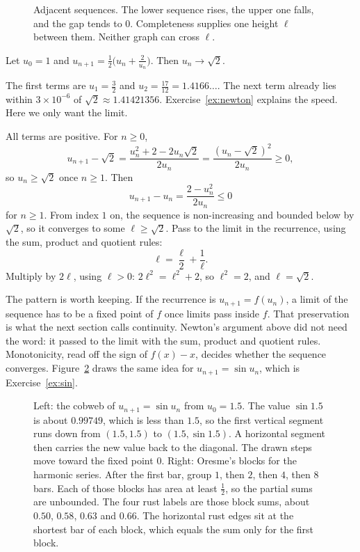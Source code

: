 \begin{figure}[ht]
\centering
{}
\caption{Adjacent sequences. The lower sequence rises, the upper one falls, and the gap tends to $0$. Completeness supplies one height $\ell$ between them. Neither graph can cross $\ell$.}
\label{fig:squeeze}
\end{figure}

\begin{examplex}
Let $u_0=1$ and $u_{n+1}=\frac12\bigl(u_n+\frac2{u_n}\bigr)$. Then $u_n\to\sqrt2$.
\end{examplex}

The first terms are $u_1=\frac32$ and $u_2=\frac{17}{12}=1.4166\ldots$. The next term already lies within $3\times10^{-6}$ of $\sqrt2\approx1.41421356$. Exercise~\ref{ex:newton} explains the speed. Here we only want the limit.

All terms are positive. For $n\ge0$,
\[
u_{n+1}-\sqrt2=\frac{u_n^2+2-2u_n\sqrt2}{2u_n}=\frac{(u_n-\sqrt2)^2}{2u_n}\ge0,
\]
so $u_n\ge\sqrt2$ once $n\ge1$. Then
\[
u_{n+1}-u_n=\frac{2-u_n^2}{2u_n}\le0
\]
for $n\ge1$. From index $1$ on, the sequence is non-increasing and bounded below by $\sqrt2$, so it converges to some $\ell\ge\sqrt2$. Pass to the limit in the recurrence, using the sum, product and quotient rules:
\[
\ell=\frac\ell2+\frac1\ell.
\]
Multiply by $2\ell$, using $\ell>0$: $2\ell^2=\ell^2+2$, so $\ell^2=2$, and $\ell=\sqrt2$.

The pattern is worth keeping. If the recurrence is $u_{n+1}=f(u_n)$, a limit of the sequence has to be a fixed point of $f$ once limits pass inside $f$. That preservation is what the next section calls continuity. Newton's argument above did not need the word: it passed to the limit with the sum, product and quotient rules. Monotonicity, read off the sign of $f(x)-x$, decides whether the sequence converges. Figure~\ref{fig:cobweb} draws the same idea for $u_{n+1}=\sin u_n$, which is Exercise~\ref{ex:sin}.

\begin{figure}[ht]
\centering
{}
\caption{Left: the cobweb of $u_{n+1}=\sin u_n$ from $u_0=1.5$. The value $\sin 1.5$ is about $0.99749$, which is less than $1.5$, so the first vertical segment runs down from $(1.5,1.5)$ to $(1.5,\sin 1.5)$. A horizontal segment then carries the new value back to the diagonal. The drawn steps move toward the fixed point $0$. Right: Oresme's blocks for the harmonic series. After the first bar, group $1$, then $2$, then $4$, then $8$ bars. Each of those blocks has area at least $\frac12$, so the partial sums are unbounded. The four rust labels are those block sums, about $0.50$, $0.58$, $0.63$ and $0.66$. The horizontal rust edges sit at the shortest bar of each block, which equals the sum only for the first block.}
\label{fig:cobweb}
\end{figure}

